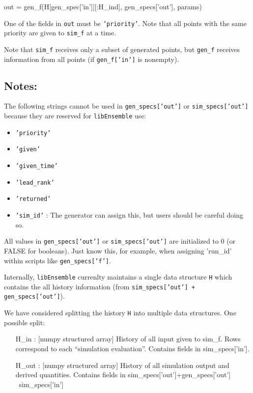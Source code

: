 \documentclass{article}
\newenvironment{allintypewriter}{\ttfamily}{\par}
\newcommand{\libE}{\texttt{libEnsemble}\xspace}
\begin{document}
\begin{allintypewriter}
  out = gen\_f(H[gen\_spec['in']][:H\_ind], gen\_specs['out'], params)\\
\end{allintypewriter}

One of the fields in \texttt{out} must be \texttt{'priority'}. Note that all
points with the same priority are given to \texttt{sim\_f} at a time.

Note that \texttt{sim\_f} receives only a subset of generated points, but
\texttt{gen\_f} receives information from all points (if \texttt{gen\_f['in']}
is nonempty).

\subsection{Notes:}
The following strings cannot be used in  \texttt{gen\_specs['out']} or
\texttt{sim\_specs['out']} because they are reserved for \libE use:
\begin{itemize}
  \item \texttt{'priority'}
  \item \texttt{'given'}
  \item \texttt{'given\_time'}
  \item \texttt{'lead\_rank'}
  \item \texttt{'returned'}
  \item \texttt{'sim\_id'} : The generator can assign this, but users should be
    careful doing so.
\end{itemize}

All values in \texttt{gen\_specs['out']} or \texttt{sim\_specs['out']} are
initialized to 0 (or FALSE for booleans). Just know this, for example, when
assigning 'run\_id' within scripts like \texttt{gen\_specs['f']}.

Internally, \libE currenlty maintains a single data structure \texttt{H} which
contains the all history information (from \texttt{sim\_specs['out'] +
gen\_specs['out']}). 

We have considered splitting the history \texttt{H} into multiple data structures. One possible split:

\begin{allintypewriter}
  \begin{itemize}
    \item[H\_in]: [numpy structured array] History of all input given to
      sim\_f. Rows correspond to each ``simulation evaluation''. Contains fields
      in sim\_specs['in']. 
      
    \item[H\_out]: [numpy structured array] History of all simulation output
      and derived quantities. Contains fields in sim\_specs['out']+gen\_specs['out'] \ sim\_specs['in']
  \end{itemize}
\end{allintypewriter}
\end{document}
